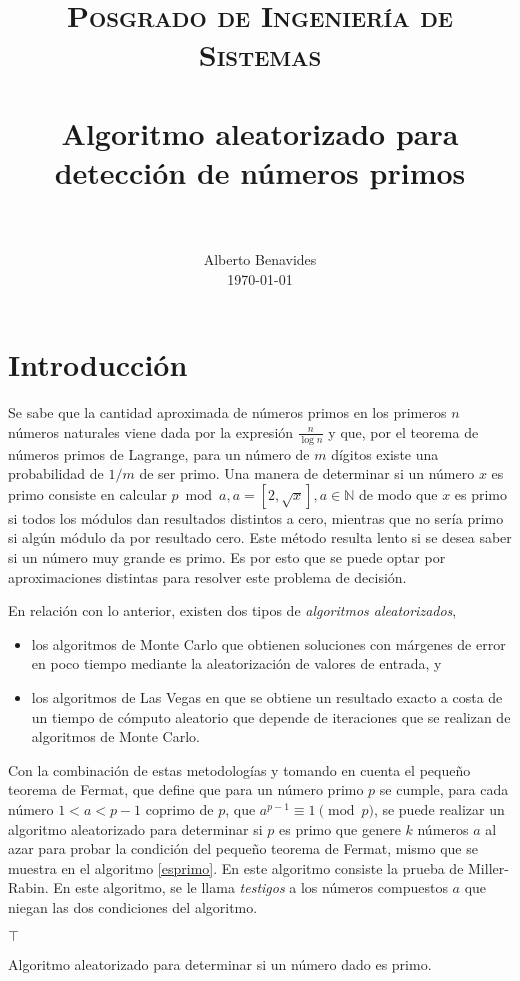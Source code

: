 \documentclass[paper=leter, fontsize=11pt]{scrartcl}
\title{
		\usefont{OT1}{bch}{b}{n}
		\normalfont \normalsize \textsc{Posgrado de Ingeniería de Sistemas} \\ [25pt]
		\horrule{0.5pt} \\[0.4cm]
		\huge Algoritmo aleatorizado para detección de números primos \\
		\horrule{2pt} \\[0.5cm]
}
\author{
		\normalfont 								\normalsize
        Alberto Benavides\\[-3pt]		\normalsize
        \today
}
\date{}
\numberwithin{equation}{section}		%
\numberwithin{figure}{section}			%
\numberwithin{table}{section}				%
\begin{document}
\maketitle

\section{Introducción}

Se sabe que la cantidad aproximada de números primos en los primeros $n$ números naturales viene dada por la expresión $\frac{n}{\log{n}}$ y que, por el teorema de números primos de Lagrange, para un número de $m$ dígitos existe una probabilidad de $1 / m$ de ser primo. Una manera de determinar si un número $x$ es primo consiste en calcular $p \bmod a, a = [2, \sqrt{x}], a \in \mathbb{N}$ de modo que $x$ es primo si todos los módulos dan resultados distintos a cero, mientras que no sería primo si algún módulo da por resultado cero. Este método resulta lento si se desea saber si un número muy grande es primo. Es por esto que se puede optar por aproximaciones distintas para resolver este problema de decisión.

En relación con lo anterior, existen dos tipos de \textit{algoritmos aleatorizados}, 
\begin{itemize}
    \item los algoritmos de Monte Carlo que obtienen soluciones con márgenes de error en poco tiempo mediante la aleatorización de valores de entrada, y
    \item los algoritmos de Las Vegas en que se obtiene un resultado exacto a costa de un tiempo de cómputo aleatorio que depende de iteraciones que se realizan de algoritmos de Monte Carlo.
\end{itemize} \nocite{aa}

Con la combinación de estas metodologías y tomando en cuenta el pequeño teorema de Fermat, que define que para un número primo $p$ se cumple, para cada número $1 < a < p - 1$ coprimo de $p$, que $a^{p - 1} \equiv 1 \pmod p$, se puede realizar un algoritmo aleatorizado para determinar si $p$ es primo que genere $k$ números $a$ al azar para probar la condición del pequeño teorema de Fermat, mismo que se muestra en el algoritmo \ref{esprimo}. En este algoritmo consiste la prueba de Miller-Rabin\cite{primality_tests}. En este algoritmo, se le llama \textit{testigos} a los números compuestos $a$ que niegan las dos condiciones del algoritmo.

\begin{algorithm} %
    \SetAlgoLined
    \Return \( \top \)

    \caption{Algoritmo aleatorizado para determinar si un número dado es primo.}
    \label{esprimo}
\end{algorithm}
\end{document}
